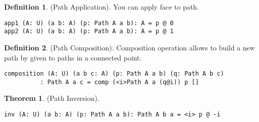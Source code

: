 \documentclass[twoside]{article}
\theoremstyle{definition}
\newtheorem{theorem}{Theorem}
\newtheorem{definition}{Definition}
\begin{document}
\begin{definition} (Path Application).
You can apply face to path.
\begin{lstlisting}
app1 (A: U) (a b: A) (p: Path A a b): A = p @ 0
app2 (A: U) (a b: A) (p: Path A a b): A = p @ 1
\end{lstlisting}
\end{definition}

\begin{definition} (Path Composition).
Composition operation allows to build a new path by given to paths
in a connected point.
\begin{center}
\end{center}
\begin{lstlisting}
composition (A: U) (a b c: A) (p: Path A a b) (q: Path A b c)
          : Path A a c = comp (<i>Path A a (q@i)) p []
\end{lstlisting}
\end{definition}

\begin{theorem} (Path Inversion).
\begin{lstlisting}
inv (A: U) (a b: A) (p: Path A a b): Path A b a = <i> p @ -i
\end{lstlisting}
\end{theorem}
\end{document}

